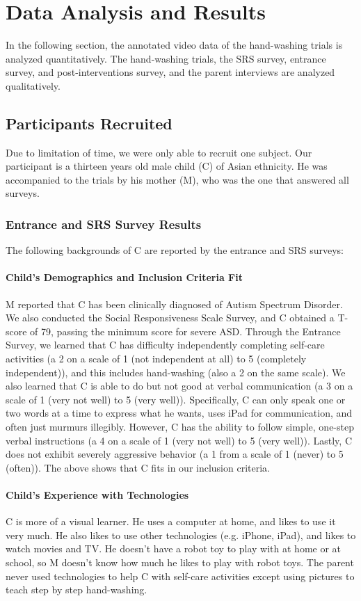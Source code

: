 \section{Data Analysis and Results}
In the following section, the annotated video data of the hand-washing trials is analyzed quantitatively.  The hand-washing trials, the SRS survey, entrance survey, and post-interventions survey, and the parent interviews are analyzed qualitatively.

\subsection{Participants Recruited}
Due to limitation of time, we were only able to recruit one subject.  Our participant is a thirteen years old male child (C) of Asian ethnicity.  He was accompanied to the trials by his mother (M), who was the one that answered all surveys.


\subsubsection{Entrance and SRS Survey Results}
The following backgrounds of C are reported by the entrance and SRS surveys:

\paragraph{Child's Demographics and Inclusion Criteria Fit}
M reported that C has been clinically diagnosed of Autism Spectrum Disorder.  We also conducted the Social Responsiveness Scale Survey, and C obtained a T-score of 79, passing the minimum score for severe ASD.  Through the Entrance Survey, we learned that C has difficulty independently completing self-care activities (a 2 on a scale of 1 (not independent at all) to 5 (completely independent)), and this includes hand-washing (also a 2 on the same scale).  We also learned that C is able to do but not good at verbal communication (a 3 on a scale of 1 (very not well) to 5 (very well)).  Specifically, C can only speak one or two words at a time to express what he wants, uses iPad for communication, and often just murmurs illegibly.  However, C has the ability to follow simple, one-step verbal instructions (a 4 on a scale of 1 (very not well) to 5 (very well)).  Lastly, C does not exhibit severely aggressive behavior (a 1 from a scale of 1 (never) to 5 (often)).  The above shows that C fits in our inclusion criteria.

\paragraph{Child's Experience with Technologies}
C is more of a visual learner.  He uses a computer at home, and likes to use it very much.  He also likes to use other technologies (e.g. iPhone, iPad), and likes to watch movies and TV.  He doesn't have a robot toy to play with at home or at school, so M doesn't know how much he likes to play with robot toys.  The parent never used technologies to help C with self-care activities except using pictures to teach step by step hand-washing.

